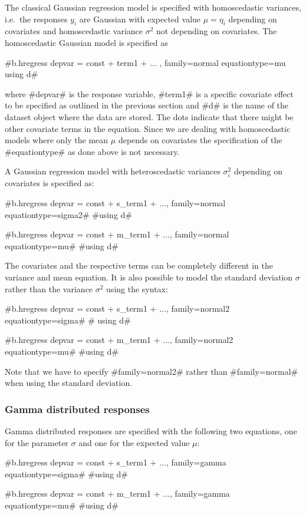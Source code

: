 The classical Gaussian regression model is specified with homoscedastic variances, i.e.~the responses $y_i$ are Gaussian with expected value $\mu = \eta_i$ depending on covariates and homoscedastic variance $\sigma^2$ not depending on covariates. The homoscedastic Gaussian model is specified as

#b.hregress depvar = const + term1 + ... , family=normal equationtype=mu using d#

where #depvar# is the response variable, #term1# is a specific covariate effect to be specified as outlined in the previous section and #d# is the name of the dataset object where the data are stored. The dots indicate that there might be other covariate terms in the equation. Since we are dealing with homoscedastic models where only the mean $\mu$ depends on covariates
the specification of the #equationtype# as done above is not necessary.

A Gaussian regression model with heteroscedastic variances $\sigma^2_i$ depending on covariates is specified as:

#b.hregress depvar = const + s_term1 + ..., family=normal equationtype=sigma2#
#using d#

#b.hregress depvar = const + m_term1 + ..., family=normal equationtype=mu#
#using d#

The covariates and the respective terms can be completely different in the variance and mean equation.
It is also possible to model the standard deviation $\sigma$ rather than the variance $\sigma^2$ using the syntax:

#b.hregress depvar = const + s_term1 + ..., family=normal2 equationtype=sigma#
# using d#

#b.hregress depvar = const + m_term1 + ..., family=normal2 equationtype=mu#
#using d#

Note that we have to specify #family=normal2# rather than #family=normal# when using the standard deviation.


\subsubsection*{Gamma distributed responses}


Gamma distributed responses are specified with the following two equations, one for the parameter $\sigma$ and one for the expected value
$\mu$:


#b.hregress depvar = const + s_term1 + ..., family=gamma equationtype=sigma#
#using d#

#b.hregress depvar = const + m_term1 + ..., family=gamma equationtype=mu#
#using d#

